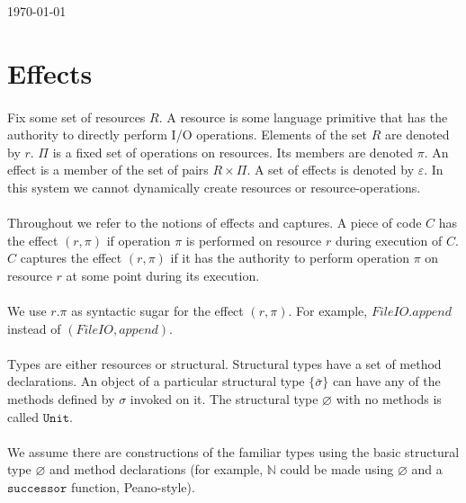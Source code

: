 \documentclass{llncs}
\newcommand{\keywadj}[1]{\mathtt{#1}}
\begin{document}
\today
\section{Effects}

\paragraph{}
Fix some set of resources $R$. A resource is some language primitive that has the authority to directly perform I/O operations. Elements of the set $R$ are denoted by $r$. $\Pi$ is a fixed set of operations on resources. Its members are denoted $\pi$. An effect is a member of the set of pairs $R \times \Pi$. A set of effects is denoted by $\varepsilon$. In this system we cannot dynamically create resources or resource-operations.

\paragraph{}
Throughout we refer to the notions of effects and captures. A piece of code $C$ has the effect $(r, \pi)$ if operation $\pi$ is performed on resource $r$ during execution of $C$. $C$ captures the effect $(r, \pi)$ if it has the authority to perform operation $\pi$ on resource $r$ at some point during its execution.

\paragraph{}
We use $r.\pi$ as syntactic sugar for the effect $(r,\pi)$. For example, $FileIO.append$ instead of $(FileIO, append)$.

\paragraph{}
Types are either resources or structural. Structural types have a set of method declarations. An object of a particular structural type $\{ \bar \sigma \}$ can have any of the methods defined by $\sigma$ invoked on it. The structural type $\varnothing$ with no methods is called $\keywadj{Unit}$.

\paragraph{}
We assume there are constructions of the familiar types using the basic structural type $\varnothing$ and method declarations (for example, $\mathbb{N}$ could be made using $\varnothing$ and a $\keywadj{successor}$ function, Peano-style).
\end{document}
